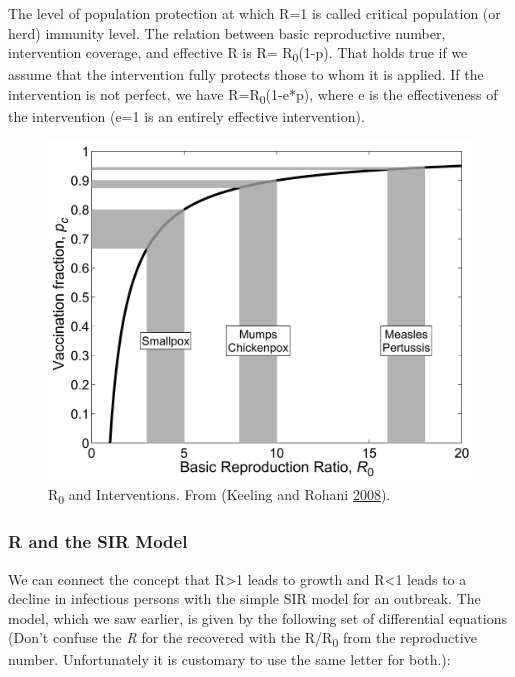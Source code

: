\documentclass[]{book}
\theoremstyle{definition}
\theoremstyle{definition}
\theoremstyle{definition}
\theoremstyle{remark}
\begin{document}
The level of population protection at which R=1 is called critical
population (or herd) immunity level. The relation between basic
reproductive number, intervention coverage, and effective R is R=
R\textsubscript{0}(1-p). That holds true if we assume that the
intervention fully protects those to whom it is applied. If the
intervention is not perfect, we have R=R\textsubscript{0}(1-e*p), where
e is the effectiveness of the intervention (e=1 is an entirely effective
intervention).

\begin{figure}
\centering
\includegraphics{./images/kr-R0intervention.png}
\caption{\label{fig:krR0intervention}R\textsubscript{0} and Interventions.
From (Keeling and Rohani \protect\hyperlink{ref-keeling08}{2008}).}
\end{figure}

\subsubsection{R and the SIR Model}\label{myadvancedbox}

We can connect the concept that R\textgreater{}1 leads to growth and
R\textless{}1 leads to a decline in infectious persons with the simple
SIR model for an outbreak. The model, which we saw earlier, is given by
the following set of differential equations (Don't confuse the \emph{R}
for the recovered with the R/R\textsubscript{0} from the reproductive
number. Unfortunately it is customary to use the same letter for both.):
\end{document}
